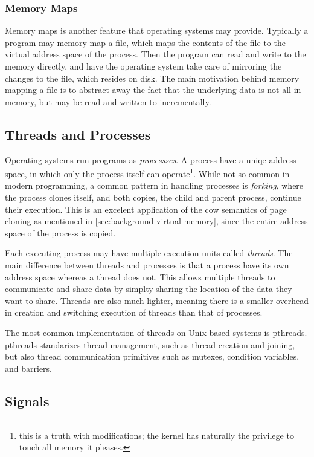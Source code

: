 \subsubsection{Memory Maps\label{sec:memory-map}}

Memory maps is another feature that operating systems may provide. Typically a program may memory
map a file, which maps the contents of the file to the virtual address space of the process. Then
the program can read and write to the memory directly, and have the operating system take care of
mirroring the changes to the file, which resides on disk.  The main motivation behind memory
mapping a file is to abstract away the fact that the underlying data is not all in memory, but may
be read and written to incrementally.


\subsection{Threads and Processes}

Operating systems run programs as \emph{processses}. A process have a uniqe address space, in which
only the process itself can operate\footnote{this is a truth with modifications; the kernel has
naturally the privilege to touch all memory it pleases.}.
While not so common in modern programming, a common pattern in handling processes is
\emph{forking}, where the process clones itself, and both copies, the child and parent process,
continue their execution. This is an excelent application of the \gls{cow} semantics of page
cloning as mentioned in \cref{sec:background-virtual-memory}, since the entire address space of the
process is copied.

Each executing process may have multiple execution units called \emph{threads}. The main difference
between threads and processes is that a process have its own address space whereas a thread does
not. This allows multiple threads to communicate and share data by simplty sharing the location of
the data they want to share. Threads are also much lighter, meaning there is a smaller overhead in
creation and switching execution of threads than that of processes.

The most common implementation of threads on Unix based systems is \gls{pthreads}. \gls{pthreads}
standarizes thread management, such as thread creation and joining, but also thread communication
primitives such as mutexes, condition variables, and barriers.


\subsection{Signals\label{sec:background-signals}}

